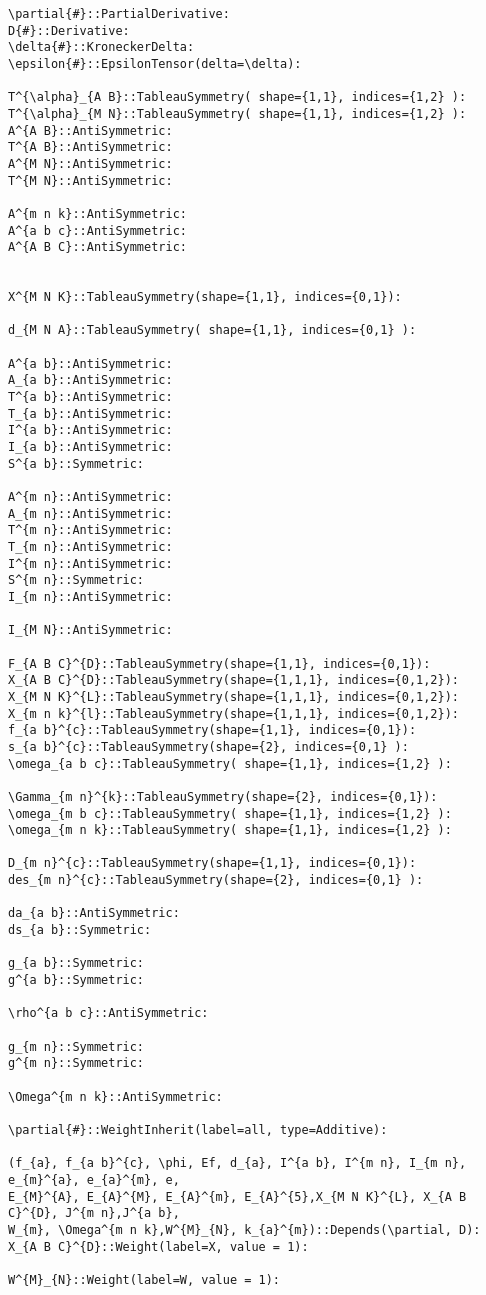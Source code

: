 \documentclass[11pt]{article}
\begin{document}
{\color[named]{Blue}\begin{verbatim}
\partial{#}::PartialDerivative:
D{#}::Derivative:
\delta{#}::KroneckerDelta:
\epsilon{#}::EpsilonTensor(delta=\delta):

T^{\alpha}_{A B}::TableauSymmetry( shape={1,1}, indices={1,2} ):
T^{\alpha}_{M N}::TableauSymmetry( shape={1,1}, indices={1,2} ):
A^{A B}::AntiSymmetric:
T^{A B}::AntiSymmetric:
A^{M N}::AntiSymmetric:
T^{M N}::AntiSymmetric:

A^{m n k}::AntiSymmetric:
A^{a b c}::AntiSymmetric:
A^{A B C}::AntiSymmetric:


X^{M N K}::TableauSymmetry(shape={1,1}, indices={0,1}):

d_{M N A}::TableauSymmetry( shape={1,1}, indices={0,1} ):

A^{a b}::AntiSymmetric:
A_{a b}::AntiSymmetric:
T^{a b}::AntiSymmetric:
T_{a b}::AntiSymmetric:
I^{a b}::AntiSymmetric:
I_{a b}::AntiSymmetric:
S^{a b}::Symmetric:

A^{m n}::AntiSymmetric:
A_{m n}::AntiSymmetric:
T^{m n}::AntiSymmetric:
T_{m n}::AntiSymmetric:
I^{m n}::AntiSymmetric:
S^{m n}::Symmetric:
I_{m n}::AntiSymmetric:

I_{M N}::AntiSymmetric:

F_{A B C}^{D}::TableauSymmetry(shape={1,1}, indices={0,1}):
X_{A B C}^{D}::TableauSymmetry(shape={1,1,1}, indices={0,1,2}):
X_{M N K}^{L}::TableauSymmetry(shape={1,1,1}, indices={0,1,2}):
X_{m n k}^{l}::TableauSymmetry(shape={1,1,1}, indices={0,1,2}):
f_{a b}^{c}::TableauSymmetry(shape={1,1}, indices={0,1}):
s_{a b}^{c}::TableauSymmetry(shape={2}, indices={0,1} ):
\omega_{a b c}::TableauSymmetry( shape={1,1}, indices={1,2} ):

\Gamma_{m n}^{k}::TableauSymmetry(shape={2}, indices={0,1}):
\omega_{m b c}::TableauSymmetry( shape={1,1}, indices={1,2} ):
\omega_{m n k}::TableauSymmetry( shape={1,1}, indices={1,2} ):

D_{m n}^{c}::TableauSymmetry(shape={1,1}, indices={0,1}):
des_{m n}^{c}::TableauSymmetry(shape={2}, indices={0,1} ):

da_{a b}::AntiSymmetric:
ds_{a b}::Symmetric:

g_{a b}::Symmetric:
g^{a b}::Symmetric:

\rho^{a b c}::AntiSymmetric:

g_{m n}::Symmetric:
g^{m n}::Symmetric:

\Omega^{m n k}::AntiSymmetric:

\partial{#}::WeightInherit(label=all, type=Additive):

(f_{a}, f_{a b}^{c}, \phi, Ef, d_{a}, I^{a b}, I^{m n}, I_{m n}, e_{m}^{a}, e_{a}^{m}, e, 
E_{M}^{A}, E_{A}^{M}, E_{A}^{m}, E_{A}^{5},X_{M N K}^{L}, X_{A B C}^{D}, J^{m n},J^{a b}, 
W_{m}, \Omega^{m n k},W^{M}_{N}, k_{a}^{m})::Depends(\partial, D):
X_{A B C}^{D}::Weight(label=X, value = 1):

W^{M}_{N}::Weight(label=W, value = 1):
\end{verbatim}}
\end{document}

